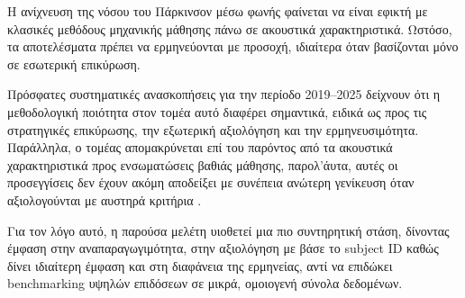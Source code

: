 Η ανίχνευση της νόσου του Πάρκινσον μέσω φωνής φαίνεται να είναι εφικτή με κλασικές μεθόδους μηχανικής μάθησης πάνω σε ακουστικά χαρακτηριστικά.
Ωστόσο, τα αποτελέσματα πρέπει να ερμηνεύονται με προσοχή, ιδιαίτερα όταν βασίζονται μόνο σε εσωτερική επικύρωση.

Πρόσφατες συστηματικές ανασκοπήσεις για την περίοδο 2019--2025 δείχνουν ότι η μεθοδολογική ποιότητα στον τομέα αυτό διαφέρει σημαντικά, ειδικά ως προς τις στρατηγικές επικύρωσης, την εξωτερική αξιολόγηση και την ερμηνευσιμότητα\citep{sedigh_malekroodi2025voice, xavier2025voice}. 
Παράλληλα, ο τομέας απομακρύνεται επί του παρόντος από τα ακουστικά χαρακτηριστικά προς ενσωματώσεις βαθιάς μάθησης, 
παρολ'άυτα, αυτές οι προσεγγίσεις δεν έχουν ακόμη αποδείξει με συνέπεια ανώτερη γενίκευση όταν αξιολογούνται με αυστηρά κριτήρια \citep{sedigh_malekroodi2025voice}. 

Για τον λόγο αυτό, η παρούσα μελέτη υιοθετεί μια πιο συντηρητική στάση, δίνοντας έμφαση στην αναπαραγωγιμότητα, στην αξιολόγηση με βάσε το subject ID καθώς δίνει ιδιαίτερη έμφαση και στη διαφάνεια της ερμηνείας, αντί να επιδώκει benchmarking υψηλών επιδόσεων σε μικρά, ομοιογενή σύνολα δεδομένων.